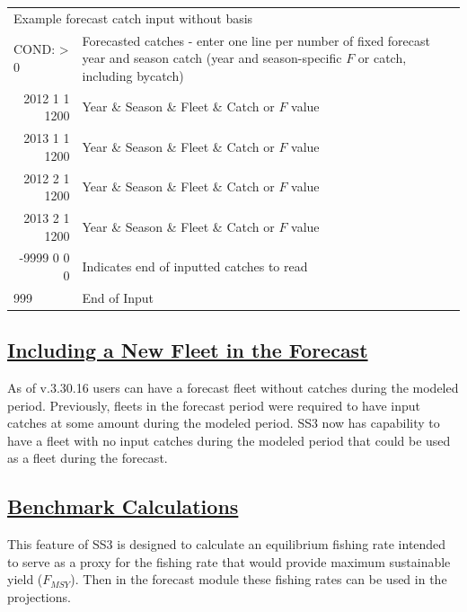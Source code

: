 \begin{landscape}
{\begin{longtable}{p{2cm} p{7cm} p{12cm}}
  \multicolumn{3}{l}{Example forecast catch input without basis} \\
  \multicolumn{1}{l}{COND: > 0} & \multicolumn{2}{l}{Forecasted catches - enter one line per number of fixed forecast year and season catch (year and season-specific $F$ or catch, including bycatch)} \Tstrut\\
  \multicolumn{1}{r}{2012 1 1 1200} & \multicolumn{2}{l}{Year \& Season \& Fleet \& Catch or $F$ value} \\
  \multicolumn{1}{r}{2013 1 1 1200} & \multicolumn{2}{l}{Year \& Season \& Fleet \& Catch or $F$ value} \\
  \multicolumn{1}{r}{2012 2 1 1200} & \multicolumn{2}{l}{Year \& Season \& Fleet \& Catch or $F$ value} \\
  \multicolumn{1}{r}{2013 2 1 1200} & \multicolumn{2}{l}{Year \& Season \& Fleet \& Catch or $F$ value} \\
  \multicolumn{1}{r}{-9999 0 0 0} & \multicolumn{2}{l}{Indicates end of inputted catches to read} \Bstrut\\

  \hline
  999 & End of Input & \Bstrut\\

  \end{longtable}}
\end{landscape}

\hypertarget{NewFleetForecast}{}
\subsection[Including a New Fleet in the Forecast]{\protect\hyperlink{NewFleetForecast}{Including a New Fleet in the Forecast}}
As of v.3.30.16 users can have a forecast fleet without catches during the modeled period. Previously, fleets in the forecast period were required to have input catches at some amount during the modeled period. SS3 now has capability to have a fleet with no input catches during the modeled period that could be used as a fleet during the forecast.

\hypertarget{Benchmark}{}
\subsection[Benchmark Calculations]{\protect\hyperlink{Benchmark}{Benchmark Calculations}}
This feature of SS3 is designed to calculate an equilibrium fishing rate intended to serve as a proxy for the fishing rate that would provide maximum sustainable yield ($F_{MSY}$). Then in the forecast module these fishing rates can be used in the projections.


